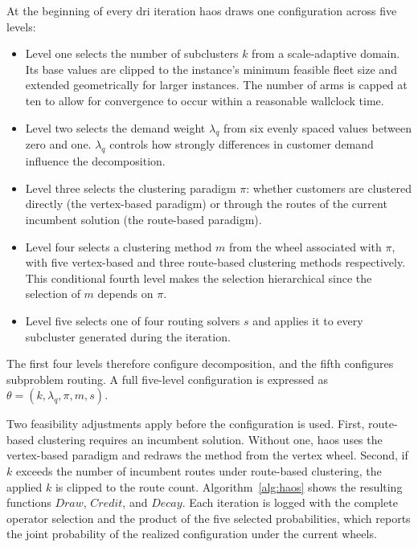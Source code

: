 At the beginning of every \gls{dri} iteration \gls{haos} draws one configuration across five levels:
\begin{itemize}
  \item Level one selects the number of subclusters $k$ from a scale-adaptive domain. Its base values are clipped to the instance's minimum feasible fleet size and extended geometrically for larger instances. The number of arms is capped at ten to allow for convergence to occur within a reasonable wallclock time.
  \item Level two selects the demand weight $\lambda_q$ from six evenly spaced values between zero and one. $\lambda_q$ controls how strongly differences in customer demand influence the decomposition.
  \item Level three selects the clustering paradigm $\pi$: whether customers are clustered directly (the vertex-based paradigm) or through the routes of the current incumbent solution (the route-based paradigm).
  \item Level four selects a clustering method $m$ from the wheel associated with $\pi$, with five vertex-based and three route-based clustering methods respectively. This conditional fourth level makes the selection hierarchical since the selection of $m$ depends on $\pi$.
  \item Level five selects one of four routing solvers $s$ and applies it to every subcluster generated during the iteration.
\end{itemize}
The first four levels therefore configure decomposition, and the fifth configures subproblem routing. A full five-level configuration is expressed as $\theta = (k, \lambda_q, \pi, m, s)$.

Two feasibility adjustments apply before the configuration is used. First, route-based clustering requires an incumbent solution. Without one, \gls{haos} uses the vertex-based paradigm and redraws the method from the vertex wheel. Second, if $k$ exceeds the number of incumbent routes under route-based clustering, the applied $k$ is clipped to the route count. Algorithm~\ref{alg:haos} shows the resulting functions $Draw$, $Credit$, and $Decay$. Each iteration is logged with the complete operator selection and the product of the five selected probabilities, which reports the joint probability of the realized configuration under the current wheels.

